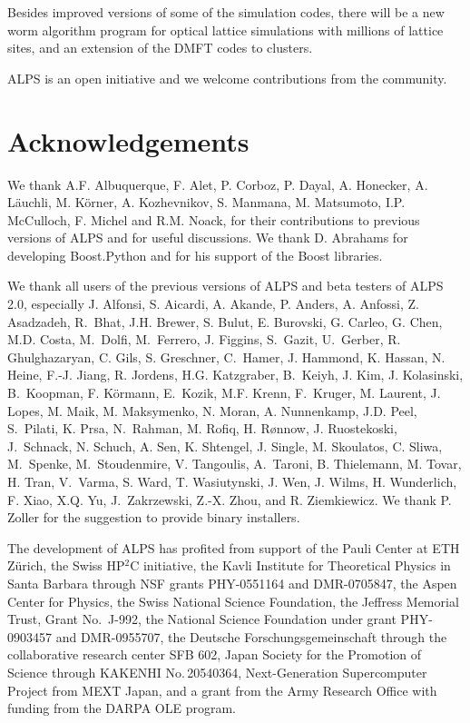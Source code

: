 \documentclass[12pt]{iopart}
\begin{document}
Besides improved versions of some of the simulation codes, there will be a new worm algorithm program for optical lattice simulations with millions of lattice sites, and an extension of the DMFT codes to clusters.

ALPS is an open initiative and we welcome contributions from the community.


\section{Acknowledgements}

We thank A.F. Albuquerque, F. Alet, P. Corboz, P. Dayal, A. Honecker, A. L\"auchli, M. K\"orner, A. Kozhevnikov, S. Manmana, M. Matsumoto, I.P. McCulloch, F. Michel and R.M. Noack, for their contributions to previous versions of ALPS and for useful discussions. We thank D. Abrahams for developing Boost.Python and for his support of the Boost libraries.

We thank all users of the previous versions of ALPS and beta testers of ALPS 2.0, especially J. Alfonsi, S. Aicardi, A. Akande, P. Anders, A. Anfossi, Z. Asadzadeh, R.~Bhat, J.H. Brewer, S. Bulut, E. Burovski, G. Carleo, G. Chen, M.D. Costa, M.~Dolfi, M.~Ferrero, J. Figgins, S.~Gazit, U.~Gerber, R. Ghulghazaryan, C. Gils, S. Greschner, C.~Hamer, J. Hammond, K. Hassan, N. Heine, F.-J. Jiang, R. Jordens, H.G. Katzgraber, B.~Keiyh, J. Kim, J. Kolasinski, B.~Koopman, F. K\"ormann, E.~Kozik, M.F. Krenn, F.~Kruger, M. Laurent, J. Lopes, M. Maik, M. Maksymenko, N. Moran, A. Nunnenkamp, J.D. Peel, S.~Pilati, K. Prsa, N.~Rahman, M. Rofiq, H. R\o nnow, J. Ruostekoski, J.~Schnack, N. Schuch, A. Sen, K. Shtengel, J. Single, M. Skoulatos, C. Sliwa, M.~Spenke, M.~Stoudenmire, V. Tangoulis, A.~Taroni, B. Thielemann, M. Tovar, H. Tran, V.~Varma, S. Ward, T. Wasiutynski, J. Wen, J. Wilms, H. Wunderlich, F. Xiao, X.Q. Yu, J.~Zakrzewski, Z.-X. Zhou, and R. Ziemkiewicz. We thank P. Zoller for the suggestion to provide binary installers. 

The development of ALPS has profited from support of the Pauli Center at ETH Z\"urich, the Swiss HP$^2$C initiative, the Kavli Institute for Theoretical Physics in Santa Barbara through NSF grants PHY-0551164 and DMR-0705847, the Aspen Center for Physics, the Swiss National Science Foundation, the Jeffress Memorial Trust, Grant No.~J-992, the National Science Foundation under grant PHY-0903457 and DMR-0955707, the Deutsche Forschungsgemeinschaft through the collaborative research center SFB 602, Japan Society for the Promotion of Science through KAKENHI No.\,20540364, Next-Generation Supercomputer Project from MEXT Japan, and a grant from the Army Research Office with funding from the DARPA OLE program. 
\end{document}
